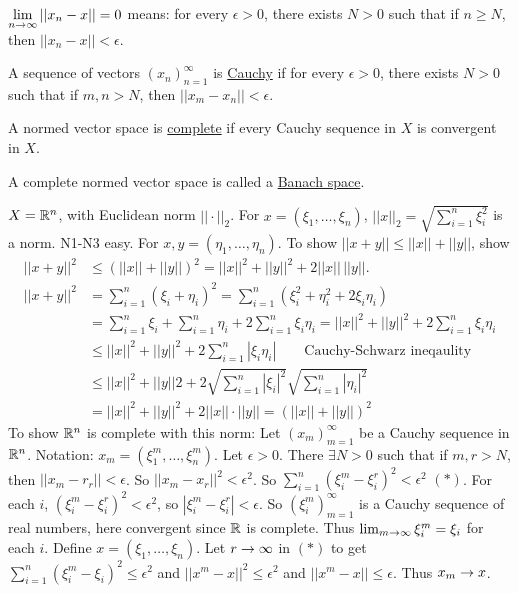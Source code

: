 \documentclass[]{article}
\begin{document}
\begin{recall}
	$\displaystyle\lim_{n\rightarrow\infty} ||x_n-x||=0$ means: for every $\epsilon>0$, there exists $N>0$ such that if $n\geq N$, then $||x_n-x||<\epsilon$.
\end{recall}

\begin{definition}
	A sequence of vectors $(x_n)_{n=1}^\infty$ is \ul{Cauchy} if for every $\epsilon>0$, there exists $N>0$ such that if $m,n>N$, then $||x_m-x_n||<\epsilon$.
\end{definition}
\begin{definition}
	A normed vector space is \ul{complete} if every Cauchy sequence in $X$ is convergent in $X$.
\end{definition}
\begin{definition}
	A complete normed vector space is called a \ul{Banach space}.
\end{definition}

\begin{example}
	$X = \mathbb{R}^n$, with Euclidean norm $||\cdot ||_2$. For $x=(\xi_1,\dots,\xi_n)$, $||x||_2 = \sqrt{\sum_{i=1}^n \xi_i^2}$ is a norm. N1-N3 easy.
	For $x,y=(\eta_1,\dots,\eta_n)$.
	To show $||x+y|| \leq ||x||+||y||$, show
	\begin{align*}
		||x+y||^2 &\leq (||x||+||y||)^2 = ||x||^2 + ||y||^2 + 2 ||x||\,||y||. \\
		||x+y||^2 &= \sum_{i=1}^n (\xi_i+\eta_i)^2 
				  = \sum_{i=1}^n (\xi_i^2 + \eta_i^2 + 2\xi_i\eta_i) \\
				  &= \sum_{i=1}^n \xi_i + \sum_{i=1}^n \eta_i + 2\sum_{i=1}^n \xi_i\eta_i
				  = ||x||^2 + ||y||^2 + 2\sum_{i=1}^n \xi_i\eta_i \\
				  &\leq ||x||^2 + ||y||^2 + 2\sum_{i=1}^n |\xi_i\eta_i| \qquad \text{Cauchy-Schwarz ineqaulity}\\
				  &\leq ||x||^2 + ||y||2 + 2\sqrt{\sum_{i=1}^n|\xi_i|^2} \sqrt{\sum_{i=1}^n|\eta_i|^2} \\
				  &= ||x||^2 + ||y||^2 + 2||x||\cdot||y|| = (||x||+||y||)^2
	\end{align*}
	To show $\mathbb{R}^n$ is complete with this norm:
	Let $(x_m)_{m=1}^\infty$ be a Cauchy sequence in $\mathbb{R}^n$.
	Notation: $x_m = (\xi_1^m,\dots,\xi_n^m)$.
	Let $\epsilon>0$. There $\exists N>0$ such that if $m,r>N$, then $||x_m-r_r||<\epsilon$.
	So $||x_m-x_r||^2 < \epsilon^2$.
	So $\sum_{i=1}^n (\xi_i^m-\xi_i^r)^2 < \epsilon^2$ $(*)$.
	For each $i$, $(\xi_i^m-\xi_i^r)^2<\epsilon^2$, so $|\xi_i^m-\xi_i^r|<\epsilon$.
	So $(\xi_i^m)_{m=1}^\infty$ is a Cauchy sequence of real numbers, here convergent since $\mathbb{R}$ is complete.
	Thus $\lim_{m\rightarrow\infty} \xi_i^m = \xi_i$ for each $i$.
	Define $x = (\xi_1,\dots,\xi_n)$.
	Let $r\rightarrow\infty$ in $(*)$ to get $\sum_{i=1}^n(\xi_i^m-\xi_i)^2\leq\epsilon^2$ and $||x^m-x||^2 \leq \epsilon^2$ and $||x^m-x||\leq \epsilon$.
	Thus $x_m\rightarrow x$.
\end{example}
\end{document}
